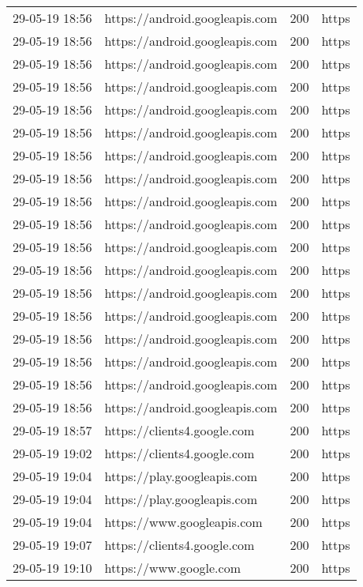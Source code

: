 \begin{longtable}[c]{@{}llll@{}}
    29-05-19 18:56 & https://android.googleapis.com & 200 & https \\
    29-05-19 18:56 & https://android.googleapis.com & 200 & https \\
    29-05-19 18:56 & https://android.googleapis.com & 200 & https \\
    29-05-19 18:56 & https://android.googleapis.com & 200 & https \\
    29-05-19 18:56 & https://android.googleapis.com & 200 & https \\
    29-05-19 18:56 & https://android.googleapis.com & 200 & https \\
    29-05-19 18:56 & https://android.googleapis.com & 200 & https \\
    29-05-19 18:56 & https://android.googleapis.com & 200 & https \\
    29-05-19 18:56 & https://android.googleapis.com & 200 & https \\
    29-05-19 18:56 & https://android.googleapis.com & 200 & https \\
    29-05-19 18:56 & https://android.googleapis.com & 200 & https \\
    29-05-19 18:56 & https://android.googleapis.com & 200 & https \\
    29-05-19 18:56 & https://android.googleapis.com & 200 & https \\
    29-05-19 18:56 & https://android.googleapis.com & 200 & https \\
    29-05-19 18:56 & https://android.googleapis.com & 200 & https \\
    29-05-19 18:56 & https://android.googleapis.com & 200 & https \\
    29-05-19 18:56 & https://android.googleapis.com & 200 & https \\
    29-05-19 18:56 & https://android.googleapis.com & 200 & https \\
    29-05-19 18:57 & https://clients4.google.com & 200 & https \\
    29-05-19 19:02 & https://clients4.google.com & 200 & https \\
    29-05-19 19:04 & https://play.googleapis.com & 200 & https \\
    29-05-19 19:04 & https://play.googleapis.com & 200 & https \\
    29-05-19 19:04 & https://www.googleapis.com & 200 & https \\
    29-05-19 19:07 & https://clients4.google.com & 200 & https \\
    29-05-19 19:10 & https://www.google.com & 200 & https \\

\end{longtable}
